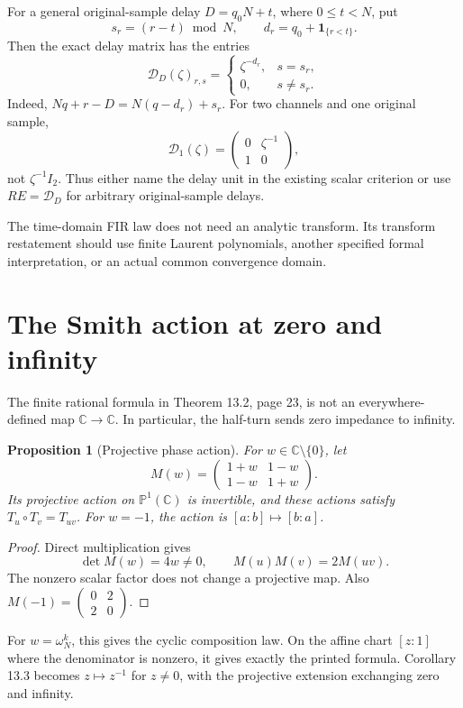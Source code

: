 \documentclass[11pt]{article}
\newtheorem{proposition}{Proposition}
\newcommand{\C}{\mathbb C}
\begin{document}
For a general original-sample delay $D=q_0N+t$, where $0\le t<N$, put
\[
s_r=(r-t)\bmod N,\qquad d_r=q_0+\mathbf1_{\{r<t\}}.
\]
Then the exact delay matrix has the entries
\[
\mathcal D_D(\zeta)_{r,s}=
\begin{cases}
\zeta^{-d_r},&s=s_r,\\
0,&s\ne s_r.
\end{cases}
\]
Indeed, $Nq+r-D=N(q-d_r)+s_r$. For two channels and one original sample,
\[
\mathcal D_1(\zeta)=
\begin{pmatrix}0&\zeta^{-1}\\1&0\end{pmatrix},
\]
not $\zeta^{-1}I_2$. Thus either name the delay unit in the existing scalar criterion or use $R E=\mathcal D_D$ for arbitrary original-sample delays.

The time-domain FIR law does not need an analytic transform. Its transform restatement should use finite Laurent polynomials, another specified formal interpretation, or an actual common convergence domain.

\section{The Smith action at zero and infinity}
The finite rational formula in Theorem 13.2, page 23, is not an everywhere-defined map $\C\to\C$. In particular, the half-turn sends zero impedance to infinity.

\begin{proposition}[Projective phase action]
For $w\in\C\setminus\{0\}$, let
\[
M(w)=\begin{pmatrix}1+w&1-w\\1-w&1+w\end{pmatrix}.
\]
Its projective action on $\mathbb P^1(\C)$ is invertible, and these actions satisfy $T_u\circ T_v=T_{uv}$. For $w=-1$, the action is $[a:b]\mapsto[b:a]$.
\end{proposition}
\begin{proof}
Direct multiplication gives
\[
\det M(w)=4w\ne0,\qquad M(u)M(v)=2M(uv).
\]
The nonzero scalar factor does not change a projective map. Also
$M(-1)=\left(\begin{smallmatrix}0&2\\2&0\end{smallmatrix}\right)$.
\end{proof}
For $w=\omega_N^k$, this gives the cyclic composition law. On the affine chart $[z:1]$ where the denominator is nonzero, it gives exactly the printed formula. Corollary 13.3 becomes $z\mapsto z^{-1}$ for $z\ne0$, with the projective extension exchanging zero and infinity.
\end{document}
